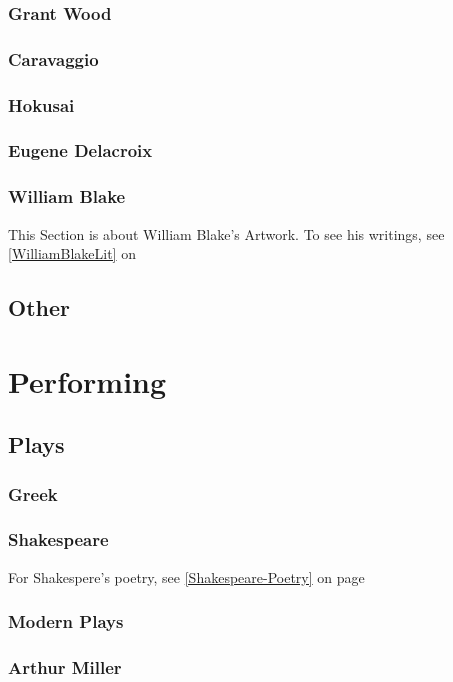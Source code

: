 			\subsubsection{Grant Wood}
			\subsubsection{Caravaggio}
			\subsubsection{Hokusai}
			\subsubsection{Eugene Delacroix}
			\subsubsection{William Blake}
			\label{WilliamBlakeArt} This Section is about William Blake's Artwork.  To see his writings, see \ref{WilliamBlakeLit} on 
			
			
		\subsection{Other}

	\section{Performing}
		\subsection{Plays}
			\subsubsection{Greek}
			\subsubsection{Shakespeare} \label{Shakespeare-Play} For Shakespere's poetry, see \ref{Shakespeare-Poetry} on page 
			\subsubsection{Modern Plays}
			\subsubsection{Arthur Miller}
			
